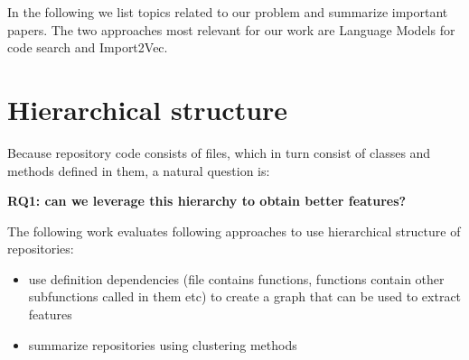 \documentclass[11pt]{report}
\begin{document}
In the following we list topics related to our problem and summarize important papers.
The two approaches most relevant for our work are Language Models for code search and Import2Vec.

\section{Hierarchical structure}

Because repository code consists of files, which in turn consist of classes and methods defined in them, a natural question is:

\textbf{\textbf{RQ1: can we leverage this hierarchy to obtain better features?}}

The following work evaluates following approaches to use hierarchical structure of repositories:

\begin{itemize}
\item use definition dependencies (file contains functions, functions contain other subfunctions called in them etc) to create a graph that can be used to extract features
\item summarize repositories using clustering methods
\end{itemize}
\end{document}
